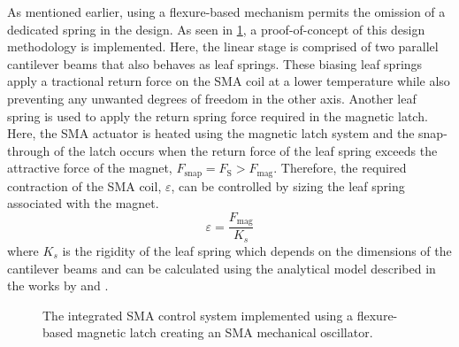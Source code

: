 As mentioned earlier, using a flexure-based mechanism permits the omission of a dedicated spring in the design. As seen in \cref{fig:proto-full}, a proof-of-concept of this design methodology is implemented. Here, the linear stage is comprised of two parallel cantilever beams that also behaves as leaf springs. These biasing leaf springs apply a tractional return force on the SMA coil at a lower temperature while also preventing any unwanted degrees of freedom in the other axis. Another leaf spring is used to apply the return spring force required in the magnetic latch. Here, the SMA actuator is heated using the magnetic latch system and the snap-through of the latch occurs when the return force of the leaf spring exceeds the attractive force of the magnet, $F_\mathrm{snap} = F_\textrm{S}>F_\textrm{mag}$. Therefore, the required contraction of the SMA coil, $\varepsilon$, can be controlled by sizing the leaf spring associated with the magnet.
\begin{equation}\label{eq:osc-stroke-sizing}
    \varepsilon = \frac{F_\textrm{mag}}{K_s}
\end{equation}
where $K_s$ is the rigidity of the leaf spring which depends on the dimensions of the cantilever beams and can be calculated using the analytical model described in the works by \cite{rubbertIsotropicSpringsBased2016} and \cite{heneinParallelSpringStages1998}.

\begin{figure}[htb!] %
  \centering
  \caption{The integrated SMA control system implemented using a flexure-based magnetic latch creating an SMA mechanical oscillator.}
  \label{fig:proto-full}
\end{figure}

